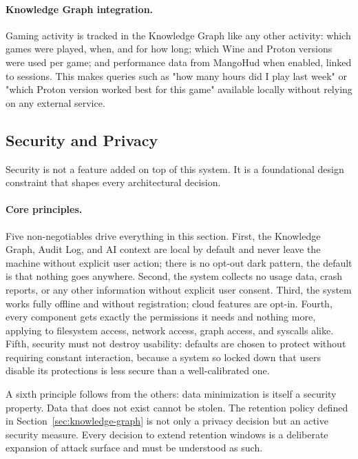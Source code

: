 \paragraph{Knowledge Graph integration.}
Gaming activity is tracked in the Knowledge Graph like any other activity:
which games were played, when, and for how long; which Wine and Proton versions
were used per game; and performance data from MangoHud when enabled, linked to
sessions. This makes queries such as "how many hours did I play last week" or
"which Proton version worked best for this game" available locally without
relying on any external service.

\subsection{Security and Privacy}
\label{sec:security}

Security is not a feature added on top of this system. It is a foundational
design constraint that shapes every architectural decision.

\paragraph{Core principles.}
Five non-negotiables drive everything in this section. First, the Knowledge
Graph, Audit Log, and AI context are local by default and never leave the
machine without explicit user action; there is no opt-out dark pattern, the
default is that nothing goes anywhere. Second, the system collects no usage
data, crash reports, or any other information without explicit user consent.
Third, the system works fully offline and without registration; cloud features
are opt-in. Fourth, every component gets exactly the permissions it needs and
nothing more, applying to filesystem access, network access, graph access, and
syscalls alike. Fifth, security must not destroy usability: defaults are
chosen to protect without requiring constant interaction, because a system so
locked down that users disable its protections is less secure than a
well-calibrated one.

A sixth principle follows from the others: data minimization is itself a
security property. Data that does not exist cannot be stolen. The retention
policy defined in Section~\ref{sec:knowledge-graph} is not only a privacy
decision but an active security measure. Every decision to extend retention
windows is a deliberate expansion of attack surface and must be understood
as such.

